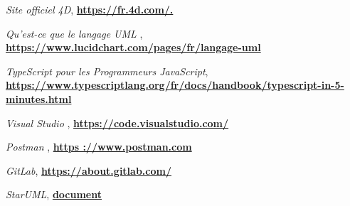 
\begin{thebibliography}{99}
    
    
    \emph{Site officiel 4D},
    \href{https://fr.4d.com/.}{\textbf{https://fr.4d.com/.}}
    
    
  
     \emph{Qu'est-ce que le langage UML },
     \href{https://www.lucidchart.com/pages/fr/langage-uml}{\textbf{https://www.lucidchart.com/pages/fr/langage-uml}}
     
     \emph{TypeScript pour les Programmeurs JavaScript},
     \href{https://www.typescriptlang.org/fr/docs/handbook/typescript-in-5-minutes.html}{\textbf{https://www.typescriptlang.org/fr/docs/handbook/typescript-in-5-minutes.html}}
     
     \emph{Visual Studio },
     \href{https://code.visualstudio.com/}{\textbf{https://code.visualstudio.com/}}
     
     \emph{Postman },
     \href{https ://www.postman.com}{\textbf{https ://www.postman.com}}
     
     \emph{GitLab},
     \href{https://about.gitlab.com/}{\textbf{https://about.gitlab.com/}}
     
     \emph{StarUML},
     \href{https://inf1410.teluq.ca/teluqDownload.php?file=2014/01/INF1410-PresentationStarUML.pdf}{\textbf{document}}
     

    \end{thebibliography}